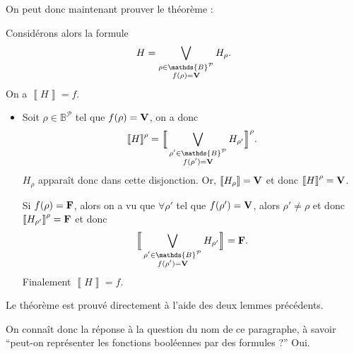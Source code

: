 On peut donc maintenant prouver le théorème :

\begin{lem}
	Considérons alors la formule \[
		H = \bigvee_{\substack{\rho \in \mathds{B}^\mathcal{P}\\f(\rho) = {\bfm V}}} H_\rho
	.\]
	On a $\left\llbracket H \right\rrbracket = f$.
\end{lem}

\begin{prv}
	\begin{itemize}
		\item Soit $\rho \in \mathds{B}^\mathcal{P}$\/ tel que $f(\rho) = {\mathbf{V}}$, on a donc \[
			\left\llbracket H \right\rrbracket^\rho = \Big\llbracket \bigvee_{\substack{\rho' \in \mathds{B}^\mathcal{P}\\f(\rho') = {\bfm V}}} H_{\rho'} \Big\rrbracket^\rho
		.\] $H_\rho$\/ apparaît donc dans cette disjonction. Or, $\left\llbracket H_\rho \right\rrbracket = {\mathbf{V}}$\/ et donc $\left\llbracket H \right\rrbracket^\rho = {\mathbf{V}}$.

		Si $f(\rho) = {\mathbf{F}}$, alors on a vu que $\forall \rho'$\/ tel que $f(\rho') = {\mathbf{V}}$, alors $\rho' \neq \rho$\/ et donc $\left\llbracket H_{\rho'} \right\rrbracket^{\rho} = {\mathbf{F}}$\/ et donc \[
			\Big\llbracket \bigvee_{\substack{\rho' \in \mathds{B}^\mathcal{P}\\f(\rho') = {\bfm V}}} H_{\rho'} \Big\rrbracket = {\bfm F}
		.\] Finalement $\left\llbracket H \right\rrbracket = f$.
	\end{itemize}
\end{prv}

Le théorème est prouvé directement à l'aide des deux lemmes précédents.

On connaît donc la réponse à la question du nom de ce paragraphe, à savoir ``peut-on représenter les fonctions booléennes par des formules ?'' Oui.

